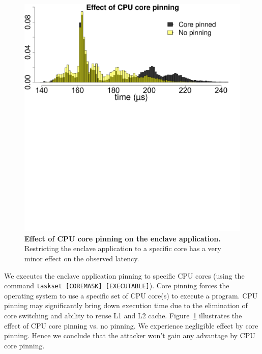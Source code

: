 \begin{figure}[t]
  \centering
    \includegraphics[trim={0 18cm 1.8cm 0}, clip, width=0.75\linewidth]{chapters/ProximiTEE/data/CPU_stress/plot_pin_1.pdf}
    \caption[Effect of CPU core pinning on the enclave application]{\textbf{Effect of CPU core pinning on the enclave application.} Restricting the enclave application to a specific core has a very minor effect on the observed latency.}

    \label{graph:cpuPin}
\end{figure}

 We executes the \name enclave application pinning to specific CPU cores (using the command \texttt{taskset [COREMASK] [EXECUTABLE]}). Core pinning forces the operating system to use a specific set of CPU core(s) to execute a program. CPU pinning may significantly bring down execution time due to the elimination of core switching and ability to reuse L1 and L2 cache. Figure~\ref{graph:cpuPin} illustrates the effect of CPU core pinning vs. no pinning. We experience negligible effect by core pinning. Hence we conclude that the attacker won't gain any advantage by CPU core pinning.

